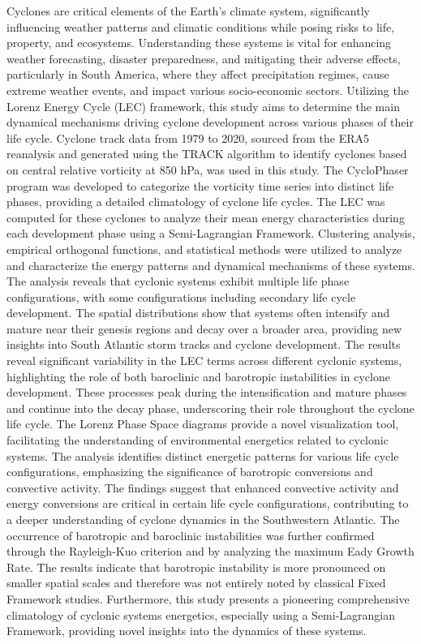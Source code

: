 Cyclones are critical elements of the Earth's climate system, significantly influencing weather patterns and climatic conditions while posing risks to life, property, and ecosystems. Understanding these systems is vital for enhancing weather forecasting, disaster preparedness, and mitigating their adverse effects, particularly in South America, where they affect precipitation regimes, cause extreme weather events, and impact various socio-economic sectors. Utilizing the Lorenz Energy Cycle (LEC) framework, this study aims to determine the main dynamical mechanisms driving cyclone development across various phases of their life cycle. Cyclone track data from 1979 to 2020, sourced from the ERA5 reanalysis and generated using the TRACK algorithm to identify cyclones based on central relative vorticity at 850 hPa, was used in this study. The CycloPhaser program was developed to categorize the vorticity time series into distinct life phases, providing a detailed climatology of cyclone life cycles. The LEC was computed for these cyclones to analyze their mean energy characteristics during each development phase using a Semi-Lagrangian Framework. Clustering analysis, empirical orthogonal functions, and statistical methods were utilized to analyze and characterize the energy patterns and dynamical mechanisms of these systems. The analysis reveals that cyclonic systems exhibit multiple life phase configurations, with some configurations including secondary life cycle development. The spatial distributions show that systems often intensify and mature near their genesis regions and decay over a broader area, providing new insights into South Atlantic storm tracks and cyclone development. The results reveal significant variability in the LEC terms across different cyclonic systems, highlighting the role of both baroclinic and barotropic instabilities in cyclone development. These processes peak during the intensification and mature phases and continue into the decay phase, underscoring their role throughout the cyclone life cycle.  The Lorenz Phase Space diagrams provide a novel visualization tool, facilitating the understanding of environmental energetics related to cyclonic systems. The analysis identifies distinct energetic patterns for various life cycle configurations, emphasizing the significance of barotropic conversions and convective activity. The findings suggest that enhanced convective activity and energy conversions are critical in certain life cycle configurations, contributing to a deeper understanding of cyclone dynamics in the Southwestern Atlantic. The occurrence of barotropic and baroclinic instabilities was further confirmed through the Rayleigh-Kuo criterion and by analyzing the maximum Eady Growth Rate. The results indicate that barotropic instability is more pronounced on smaller spatial scales and therefore was not entirely noted by classical Fixed Framework studies. Furthermore, this study presents a pioneering comprehensive climatology of cyclonic systems energetics, especially using a Semi-Lagrangian Framework, providing novel insights into the dynamics of these systems.
